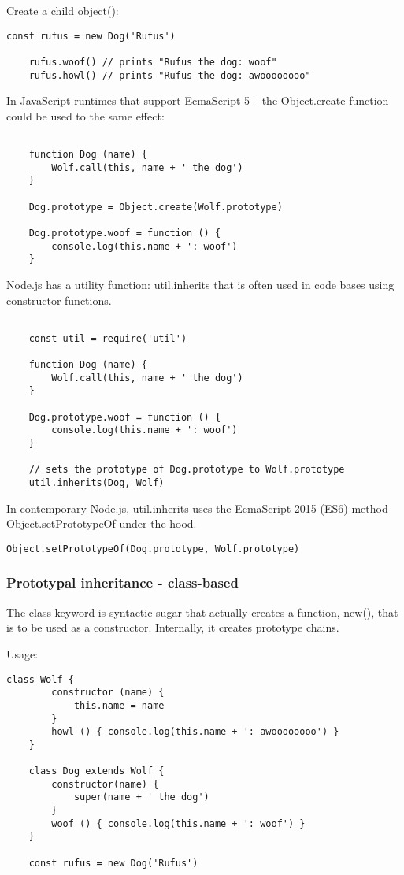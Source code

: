 \documentclass{scrartcl}
\begin{document}
Create a child object():

\begin{lstlisting}[style=ES6]
    const rufus = new Dog('Rufus')

    rufus.woof() // prints "Rufus the dog: woof"
    rufus.howl() // prints "Rufus the dog: awoooooooo"
\end{lstlisting}

 In JavaScript runtimes that support EcmaScript 5+ the Object.create function could be used to the same effect:


\begin{lstlisting}[style=ES6]

    function Dog (name) {
        Wolf.call(this, name + ' the dog')
    }

    Dog.prototype = Object.create(Wolf.prototype)

    Dog.prototype.woof = function () {
        console.log(this.name + ': woof')
    }
\end{lstlisting}

Node.js has a utility function: util.inherits that is often used in code bases using constructor functions.

\begin{lstlisting}[style=ES6]

    const util = require('util')

    function Dog (name) {
        Wolf.call(this, name + ' the dog')
    }

    Dog.prototype.woof = function () {
        console.log(this.name + ': woof')
    }

    // sets the prototype of Dog.prototype to Wolf.prototype
    util.inherits(Dog, Wolf)

\end{lstlisting}

In contemporary Node.js, util.inherits uses the EcmaScript 2015 (ES6) method Object.setPrototypeOf under the hood.

\begin{lstlisting}[style=ES6]
    Object.setPrototypeOf(Dog.prototype, Wolf.prototype)
\end{lstlisting}


\subsubsection{Prototypal inheritance - class-based}

The class keyword is syntactic sugar that actually creates a function, new(), that is to be used as a constructor.
Internally, it creates prototype chains.

Usage:

\begin{lstlisting}[style=ES6]
    class Wolf {
        constructor (name) {
            this.name = name
        }
        howl () { console.log(this.name + ': awoooooooo') }
    }

    class Dog extends Wolf {
        constructor(name) {
            super(name + ' the dog')
        }
        woof () { console.log(this.name + ': woof') }
    }

    const rufus = new Dog('Rufus')
\end{lstlisting}
\end{document}
